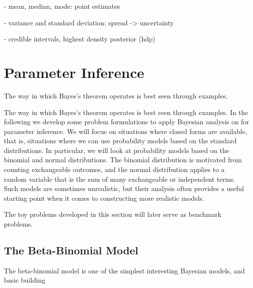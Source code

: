 - mean, median, mode: point estimates

- variance and standard deviation: spread -> uncertainty 

- credible intervals, highest density posterior (hdp) 

\section{Parameter Inference}\label{sec:param_inference}

The way in which Bayes's theorem operates is best seen through examples. 

The way in which Bayes’s theorem operates is best seen through examples. In the following we develop some problem formulations to apply Bayesian analysis on for parameter inference. We will focus on situations where closed forms are available, that is, situations where we can use probability models based on the standard distributions. In particular, we will look at probability models based on the binomial and normal distributions. The binomial distribution is motivated from counting exchangeable outcomes, and the normal distribution applies to a random variable that is the sum of many exchangeable or independent terms. Such models are sometimes unrealistic, but their analysis often provides a useful starting point when it comes to constructing more realistic models. 

The toy problems developed in this section will later serve as benchmark problems. 

\subsection{The Beta-Binomial Model}\label{sec:coin_flipping}

The beta-binomial model is one of the simplest interesting Bayesian models, and basic building



